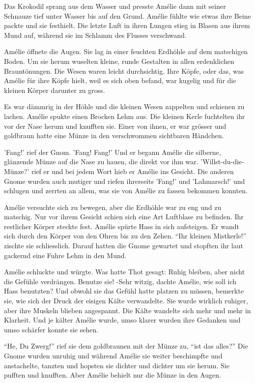 \documentclass[11pt,titlepage,a5paper]{book}
\begin{document}
Das Krokodil sprang aus dem Wasser und presste Amélie dann mit seiner Schnauze tief unter Wasser bis auf den Grund. Amélie fühlte wie etwas ihre Beine packte und sie festhielt. Die letzte Luft in ihren Lungen stieg in Blasen aus ihrem Mund auf, während sie im Schlamm des Flusses verschwand.

Amélie öffnete die Augen. Sie lag in einer feuchten Erdhöhle auf dem matschigen Boden. Um sie herum wuselten kleine, runde Gestalten in allen erdenklichen Brauntönungen. Die Wesen waren leicht durchsichtig. Ihre Köpfe, oder das, was Amélie für ihre Köpfe hielt, weil es sich oben befand, war kugelig und für die kleinen Körper darunter zu gross.

Es war dämmrig in der Höhle und die kleinen Wesen zappelten und schienen zu lachen. Amélie spukte einen Brocken Lehm aus. Die kleinen Kerle fuchtelten ihr vor der Nase herum und knufften sie. Einer von ihnen, er war grösser und goldbraun hatte eine Münze in den verschwommen sichtbaren Händchen. 

'Fang!' rief der Gnom. 'Fang! Fang!' Und er begann Amélie die silberne, glänzende Münze auf die Nase zu hauen, die direkt vor ihm war. 'Willst-du-die-Münze?' rief er und bei jedem Wort hieb er Amélie ins Gesicht. Die anderen Gnome wurden auch mutiger und riefen ihrerseits 'Fang!' und 'Lahmarsch!' und schlugen und zerrten an allem, was sie von Amélie zu fassen bekommen konnten.

Amélie versuchte sich zu bewegen, aber die Erdhöhle war zu eng und zu matschig. Nur vor ihrem Gesicht schien sich eine Art Luftblase zu befinden. Ihr restlicher Körper steckte fest. Amélie spürte Hass in sich aufsteigen. Er wandt sich durch den Körper von den Ohren bis zu den Zehen. "`Ihr kleinen Mistkerle!"' zischte sie schliesslich. Darauf hatten die Gnome gewartet und stopften ihr laut gackernd eine Fuhre Lehm in den Mund.

Amélie schluckte und würgte. Was hatte Thot gesagt: Ruhig bleiben, aber nicht die Gefühle verdrängen. Benutze sie! -Sehr witzig, dachte Amélie, wie soll ich Hass benutzten? Und obwohl sie das Gefühl hatte platzen zu müssen, bemerkte sie, wie sich der Druck der eisigen Kälte verwandelte. Sie wurde wirklich ruhiger, aber ihre Muskeln blieben angespannt. Die Kälte wandelte sich mehr und mehr in Klarheit. Und je kälter Amélie wurde, umso klarer wurden ihre Gedanken und umso schärfer konnte sie sehen. 

"`He, Du Zwerg!"' rief sie dem goldbraunen mit der Münze zu, "`ist das alles?"' Die Gnome wurden unruhig und während Amélie sie weiter beschimpfte und anstachelte, tanzten und hopsten sie dichter und dichter um sie herum. Sie pufften und knufften. Aber Amélie behielt nur die Münze in den Augen.
\end{document}
